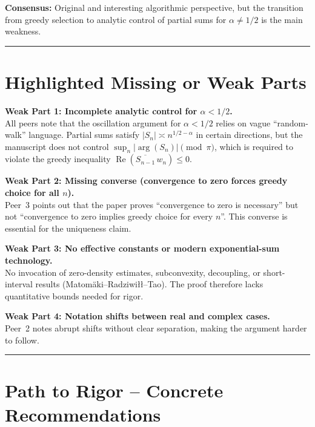\documentclass[11pt,a4paper]{article}
\begin{document}
\noindent\textbf{Consensus:} Original and interesting algorithmic perspective, but the transition from greedy selection to analytic control of partial sums for $\alpha \neq 1/2$ is the main weakness.

\bigskip\hrule\bigskip

\section{Highlighted Missing or Weak Parts}

\begin{tcolorbox}[gap]
\textbf{Weak Part 1: Incomplete analytic control for $\alpha < 1/2$.}\\[4pt]
All peers note that the oscillation argument for $\alpha < 1/2$ relies on vague ``random-walk'' language. Partial sums satisfy $|S_n| \asymp n^{1/2 - \alpha}$ in certain directions, but the manuscript does not control $\sup_n |\arg(S_n)| \pmod{\pi}$, which is required to violate the greedy inequality $\operatorname{Re}(\overline{S_{n-1}}\, w_n) \le 0$.
\end{tcolorbox}

\begin{tcolorbox}[gap]
\textbf{Weak Part 2: Missing converse (convergence to zero forces greedy choice for all $n$).}\\[4pt]
Peer~3 points out that the paper proves ``convergence to zero is necessary'' but not ``convergence to zero implies greedy choice for every $n$''. This converse is essential for the uniqueness claim.
\end{tcolorbox}

\begin{tcolorbox}[gap]
\textbf{Weak Part 3: No effective constants or modern exponential-sum technology.}\\[4pt]
No invocation of zero-density estimates, subconvexity, decoupling, or short-interval results (Matom\"aki--Radziwi\l\l--Tao). The proof therefore lacks quantitative bounds needed for rigor.
\end{tcolorbox}

\begin{tcolorbox}[gap]
\textbf{Weak Part 4: Notation shifts between real and complex cases.}\\[4pt]
Peer~2 notes abrupt shifts without clear separation, making the argument harder to follow.
\end{tcolorbox}

\bigskip\hrule\bigskip

\section{Path to Rigor -- Concrete Recommendations}
\end{document}
